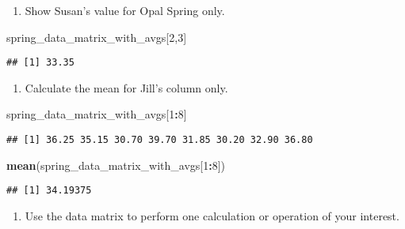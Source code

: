 \documentclass[
]{article}
\newenvironment{Shaded}{\begin{snugshade}}{\end{snugshade}}
\newcommand{\DecValTok}[1]{\textcolor[rgb]{0.00,0.00,0.81}{#1}}
\newcommand{\FunctionTok}[1]{\textcolor[rgb]{0.13,0.29,0.53}{\textbf{#1}}}
\newcommand{\NormalTok}[1]{#1}
\newcommand{\SpecialCharTok}[1]{\textcolor[rgb]{0.81,0.36,0.00}{\textbf{#1}}}
\providecommand{\tightlist}{%
  \setlength{\itemsep}{0pt}\setlength{\parskip}{0pt}}
\begin{document}
\begin{enumerate}
\def\labelenumi{\arabic{enumi}.}
\setcounter{enumi}{7}
\tightlist
\item
  Show Susan's value for Opal Spring only.
\end{enumerate}

\begin{Shaded}
\begin{Highlighting}[]
\NormalTok{spring\_data\_matrix\_with\_avgs[}\DecValTok{2}\NormalTok{,}\DecValTok{3}\NormalTok{]}
\end{Highlighting}
\end{Shaded}

\begin{verbatim}
## [1] 33.35
\end{verbatim}

\begin{enumerate}
\def\labelenumi{\arabic{enumi}.}
\setcounter{enumi}{8}
\tightlist
\item
  Calculate the mean for Jill's column only.
\end{enumerate}

\begin{Shaded}
\begin{Highlighting}[]
\NormalTok{spring\_data\_matrix\_with\_avgs[}\DecValTok{1}\SpecialCharTok{:}\DecValTok{8}\NormalTok{]}
\end{Highlighting}
\end{Shaded}

\begin{verbatim}
## [1] 36.25 35.15 30.70 39.70 31.85 30.20 32.90 36.80
\end{verbatim}

\begin{Shaded}
\begin{Highlighting}[]
\FunctionTok{mean}\NormalTok{(spring\_data\_matrix\_with\_avgs[}\DecValTok{1}\SpecialCharTok{:}\DecValTok{8}\NormalTok{])}
\end{Highlighting}
\end{Shaded}

\begin{verbatim}
## [1] 34.19375
\end{verbatim}

\begin{enumerate}
\def\labelenumi{\arabic{enumi}.}
\setcounter{enumi}{9}
\tightlist
\item
  Use the data matrix to perform one calculation or operation of your
  interest.
\end{enumerate}
\end{document}
